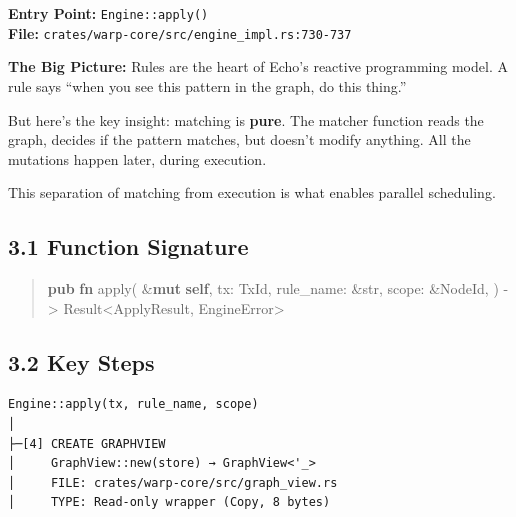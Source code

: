 \documentclass[11pt]{book}
\newenvironment{Shaded}{\begin{quote}}{\end{quote}}
\newcommand{\DataTypeTok}[1]{\textcolor[rgb]{0.56,0.13,0.00}{#1}}
\newcommand{\KeywordTok}[1]{\textcolor[rgb]{0.00,0.44,0.13}{\textbf{#1}}}
\newcommand{\NormalTok}[1]{#1}
\newcommand{\OperatorTok}[1]{\textcolor[rgb]{0.40,0.40,0.40}{#1}}
\newenvironment{bigpicture}
{\begin{mdframed}[
  linecolor=purple!60,
  linewidth=2pt,
  leftline=true,
  rightline=false,
  topline=false,
  bottomline=false,
  backgroundcolor=purple!3,
  innerleftmargin=12pt,
  innerrightmargin=10pt,
  innertopmargin=8pt,
  innerbottommargin=8pt,
  skipabove=12pt,
  skipbelow=12pt
]\small\sffamily\color{purple!70!black}\textbf{The Big Picture:} }
{\end{mdframed}}
\begin{document}
\textbf{Entry Point:} \texttt{Engine::apply()} \\
\textbf{File:} \texttt{crates/warp-core/src/engine\_impl.rs:730-737}

\begin{bigpicture}
Rules are the heart of Echo's reactive programming model. A rule says ``when you see this pattern in the graph, do this thing.''

But here's the key insight: matching is \textbf{pure}. The matcher function reads the graph, decides if the pattern matches, but doesn't modify anything. All the mutations happen later, during execution.

This separation of matching from execution is what enables parallel scheduling.
\end{bigpicture}

\subsection{3.1 Function Signature}

\begin{Shaded}
\begin{Highlighting}[]
\KeywordTok{pub} \KeywordTok{fn}\NormalTok{ apply(}
    \OperatorTok{\&}\KeywordTok{mut} \KeywordTok{self}\OperatorTok{,}
\NormalTok{    tx}\OperatorTok{:}\NormalTok{ TxId}\OperatorTok{,}
\NormalTok{    rule\_name}\OperatorTok{:} \OperatorTok{\&}\DataTypeTok{str}\OperatorTok{,}
\NormalTok{    scope}\OperatorTok{:} \OperatorTok{\&}\NormalTok{NodeId}\OperatorTok{,}
\NormalTok{) }\OperatorTok{{-}\textgreater{}} \DataTypeTok{Result}\OperatorTok{\textless{}}\NormalTok{ApplyResult}\OperatorTok{,}\NormalTok{ EngineError}\OperatorTok{\textgreater{}}
\end{Highlighting}
\end{Shaded}

\subsection{3.2 Key Steps}

\begin{verbatim}
Engine::apply(tx, rule_name, scope)
│
├─[4] CREATE GRAPHVIEW
│     GraphView::new(store) → GraphView<'_>
│     FILE: crates/warp-core/src/graph_view.rs
│     TYPE: Read-only wrapper (Copy, 8 bytes)
\end{verbatim}
\end{document}
